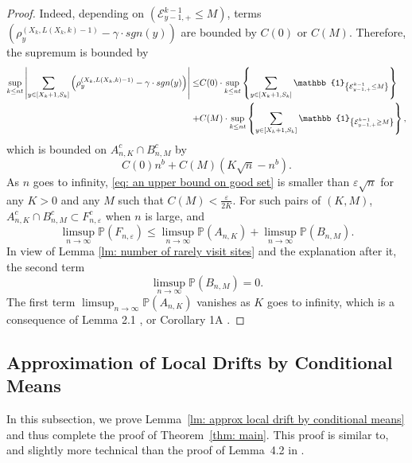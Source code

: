 \documentclass[twoside,12pt, a4paper, final]{article}
\numberwithin{equation}{section}
\theoremstyle{remark}
\newcommand{\abs}[1]{\left\vert #1 \right\vert}
\begin{document}
\begin{proof}
		Indeed, depending on $(\mathcal{E}^{k-1}_{y-1,+} \leq M)$, terms  $\left( \rho^{(X_k,L(X_k,k)-1)}_y -  \gamma \cdot sgn(y) \right)$ are bounded by $C(0)$ or $C(M)$. Therefore, the supremum is bounded by
		\begin{align*}
			\sup_{k\leq n t}  \abs{  	\sum_{y\in [X_{k}+1 ,S_k]} \left( \rho^{(X_k,L(X_k,k)-1)}_y -  \gamma \cdot sgn(y) \right) } \leq &  
			C(0) \cdot \sup_{k\leq n t} \left\{   	\sum_{y\in [X_{k}+1 ,S_k]} \mathbb{1}_{ \left\{ \mathcal{E}^{k-1}_{y-1,+} \leq M \right\} } \right\}
			\notag
			\\
			+& C(M) \cdot \sup_{k\leq n t} \left\{   	\sum_{y\in [X_{k}+1 ,S_k]} \mathbb{1}_{ \left\{ \mathcal{E}^{k-1}_{y-1,+} \geq M \right\} } \right\},
		\end{align*} which is bounded on $A^c_{n,K} \cap B^c_{n,M}$ by
		\begin{equation}\label{eq: an upper bound on good set}
			C(0)n^b  + C(M) \left(K \sqrt{n} -n^b\right).
		\end{equation} As $n$ goes to infinity, \eqref{eq: an upper bound on good set} is smaller than $\varepsilon \sqrt{n}$ for any $K>0$ and any $M$ such that $C(M) < \frac{\varepsilon}{2K}$. 
		For such pairs of $(K,M)$, $A^c_{n,K} \cap B^c_{n,M} \subset F^c_{n,\varepsilon}$ when $n$ is large,  and 
		$$
		\limsup_{n\to \infty} \mathbb{P}(F_{n,\varepsilon}) \leq \limsup_{n\to \infty}  \mathbb{P}(A_{n,K}) +  \limsup_{n\to \infty}  \mathbb{P}(B_{n,M}).
		$$ In view of Lemma \ref{lm: number of rarely visit sites} and the explanation after it, the second term $$\limsup_{n\to \infty}  \mathbb{P}(B_{n,M})=0.$$  The first term $\limsup_{n\to \infty}  \mathbb{P}(A_{n,K}) $ vanishes as $K$ goes to infinity, which is a consequence of Lemma 2.1 \cite{KMP23}, or Corollary 1A \cite{T96}.
	\end{proof}
	
	
	\subsection{Approximation of Local Drifts by Conditional Means}
	\label{sec:DeltaRho}
	In this subsection, we prove Lemma~\ref{lm: approx local drift by conditional means} and thus complete the proof of Theorem~\ref{thm: main}. This proof is similar to, and slightly more technical than the proof of {Lemma~4.2} in \cite{KP16}. 
	
\end{document}
